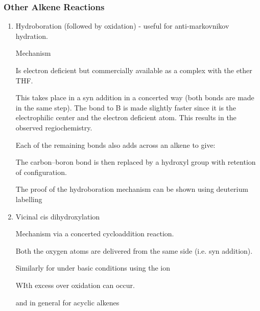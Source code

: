 \subsubsection{Other Alkene Reactions}

\begin{enumerate}[label=\alph*)]

  \item Hydroboration (followed by oxidation) - useful for anti-markovnikov
    hydration.


    Mechanism


    Is electron deficient but commercially available as a complex with the ether
    THF.


    This takes place in a syn addition in a concerted way (both bonds are made
    in the same step). The bond to B is made slightly faster since it is the
    electrophilic center and the electron deficient atom. This results in the
    observed regiochemistry.

    Each of the remaining  bonds also adds across an alkene to give:


    The carbon--boron bond is then replaced by a hydroxyl group with retention
    of configuration.


    The proof of the hydroboration mechanism can be shown using deuterium labelling


  \item Vicinal cis dihydroxylation


    Mechanism via a concerted cycloaddition reaction.


    Both the oxygen atoms are delivered from the same side (i.e. syn addition).

    Similarly for  under basic conditions using the ion


    WIth excess  over oxidation can occur.


    and in general for acyclic alkenes


\end{enumerate}
